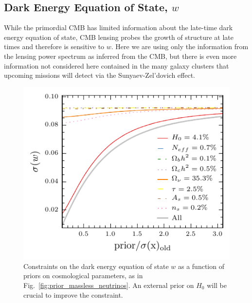 \documentclass[aps,prd,reprint,superscriptaddress]{revtex4-1}
\newcommand{\reffig}[1]{Fig.~\ref{fig:#1}}
\begin{document}
%
%
%

\subsection{Dark Energy Equation of State, $w$}

While the primordial CMB has limited information about the late-time dark energy equation of state, CMB lensing probes the growth of structure at late times and therefore is sensitive to $w$. Here we are using only the information from the lensing power spectrum as inferred from the CMB, but there is even more information not considered here contained in the many galaxy clusters that upcoming missions will detect via the Sunyaev-Zel'dovich effect. 


\begin{figure}[htbp]
\begin{center}
\includegraphics{prior_w_snow_mass.pdf}
\caption{Constraints on the dark energy equation of state $w$ as a function of priors on cosmological parameters, as in \reffig{prior_massless_neutrinos}. An external prior on $H_{0}$ will be crucial to improve the constraint.} 
\label{fig:prior_w}
\end{center}
\end{figure}
\end{document}
